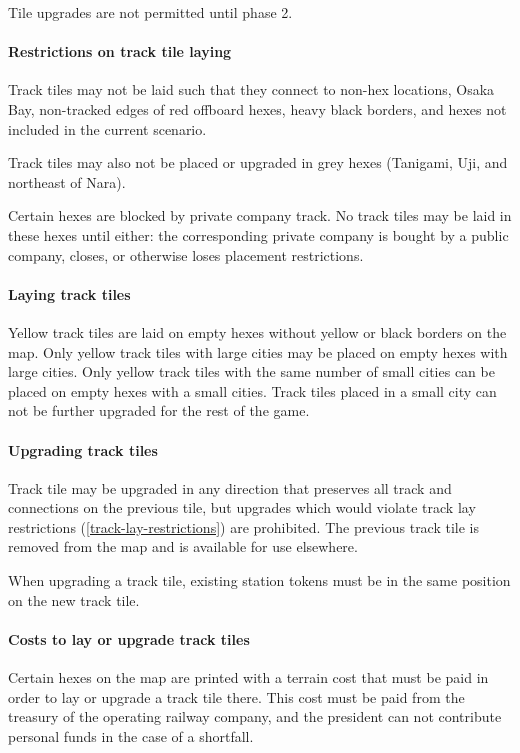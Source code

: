 \documentclass{article}
\begin{document}
\begin{CJK}{UTF8}{min}
\begin{multicols}{2}
Tile upgrades are not permitted until phase 2.

\paragraph{Restrictions on track tile laying}
\label{track-lay-restrictions}
Track tiles may not be laid such that they connect to non-hex
locations, Osaka Bay, non-tracked edges of red offboard hexes, heavy
black borders, and hexes not included in the current scenario.

Track tiles may also not be placed or upgraded in grey hexes
(Tanigami, Uji, and northeast of Nara).

Certain hexes are blocked by private company track. No track tiles may
be laid in these hexes until either: the corresponding private company
is bought by a public company, closes, or otherwise loses placement
restrictions.

\paragraph{Laying track tiles}
Yellow track tiles are laid on empty hexes without yellow or black
borders on the map. Only yellow track tiles with large cities may be
placed on empty hexes with large cities. Only yellow track tiles with
the same number of small cities can be placed on empty hexes with a
small cities. Track tiles placed in a small city can not be further
upgraded for the rest of the game.

\paragraph{Upgrading track tiles}
Track tile may be upgraded in any direction that preserves all track
and connections on the previous tile, but upgrades which would violate
track lay restrictions (\autoref{track-lay-restrictions}) are
prohibited. The previous track tile is removed from the map and is
available for use elsewhere.

When upgrading a track tile, existing station tokens must be in the
same position on the new track tile.


\paragraph{Costs to lay or upgrade track tiles}
Certain hexes on the map are printed with a terrain cost that must be paid in
order to lay or upgrade a track tile there. This cost must be paid
from the treasury of the operating railway company, and the president
can not contribute personal funds in the case of a shortfall.


\end{multicols}
\end{CJK}
\end{document}
